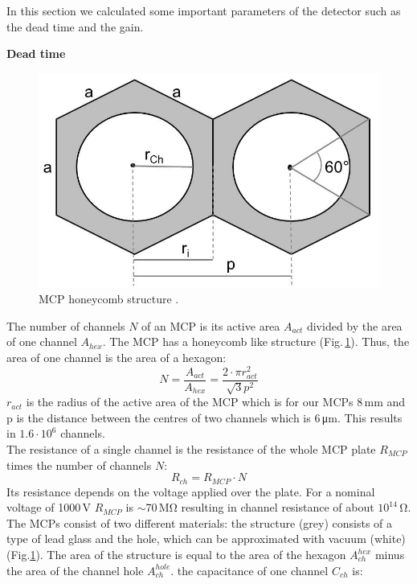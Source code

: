 	
	In this section we calculated some important parameters of the detector such as the dead time and the gain. %
	
	\textbf{Dead time}\\
	
	\begin{figure}[h]
		\centering
		\includegraphics[width=.4\textwidth]{Bilder/MCP_hex.jpg}
		\caption{MCP honeycomb structure \cite{Diss_Neuland}.}
		\label{fig:MCPhex} %
	\end{figure}
	The number of channels $N$ of an MCP is its active area $A_{act}$ divided by the area of one channel $A_{hex}$. The MCP has a honeycomb like structure (Fig.\,\ref{fig:MCPhex}). Thus, the area of one channel is the area of a hexagon:
	\begin{equation}
		N = \frac{A_{act}}{A_{hex}} = \frac{2\cdot\pi r^2_{act}}{\sqrt{3}p^2}
	\end{equation}
	$r_{act}$ is the radius of the active area of the MCP which is for our MCPs 8\,\si{\milli\meter} and p is the distance between the centres of two channels which is 6\,\si{\micro\meter}. This results in $1.6\cdot10^6$ channels.\\
	The resistance of a single channel is the resistance of the whole MCP plate $R_{MCP}$ times the number of channels $N$:
	\begin{equation}
		R_{ch} = R_{MCP}\cdot N
	\end{equation}
	Its resistance depends on the voltage applied over the plate. For a nominal voltage of 1000\,\si{\volt} $R_{MCP}$ is $\sim$70\,\si{\mega\ohm} resulting in channel resistance of about $10^{14}$\,\si{\ohm}.\\
	The MCPs consist of two different materials: the structure (grey) consists of a type of lead glass and the hole, which can be approximated with vacuum (white) (Fig.\ref{fig:MCPhex}). The area of the structure is equal to the area of the hexagon $A^{hex}_{ch}$ minus the area of the channel hole $A^{hole}_{ch}$. the capacitance of one channel $C_{ch}$ is:
